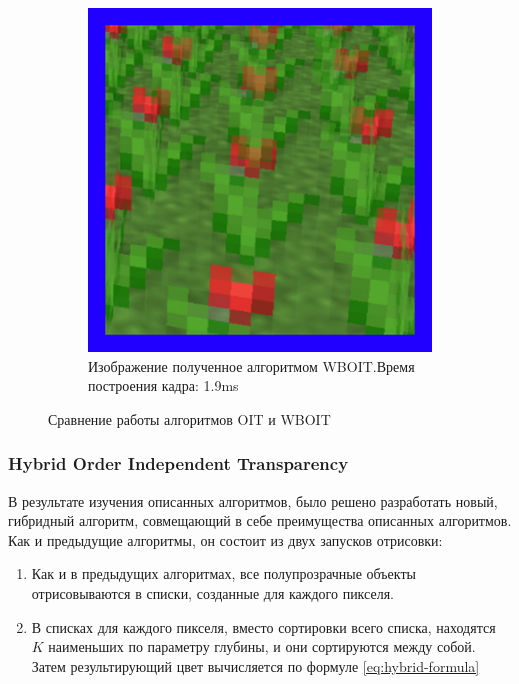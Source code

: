 \begin{figure}[!htbp]
\begin{subfigure}[b]{0.3\textwidth}
					\includegraphics[width=\textwidth]{my_folder/images//wboit_flower}
					\caption{Изображение полученное алгоритмом WBOIT.\linebreak Время построения кадра: 1.9ms}
					\label{fig:wboit_flower}
				\end{subfigure}				
				\captionsetup{justification=centering} %
				\caption{Сравнение работы алгоритмов OIT и WBOIT}\label{fig:oit_vs_wboit} 
			\end{figure}
			
		\subsubsection{Hybrid Order Independent Transparency} \label{ch3:render_pass:transparents:hybrid_oit}
			В результате изучения описанных алгоритмов, было решено разработать новый, гибридный алгоритм, совмещающий в себе преимущества описанных алгоритмов. Как и предыдущие алгоритмы, он состоит из двух запусков отрисовки:
			
			\begin{enumerate}[1.]
				\item Как и в предыдущих алгоритмах, все полупрозрачные объекты отрисовываются в списки, созданные для каждого пикселя.
				\item В списках для каждого пикселя, вместо сортировки всего списка, находятся $K$ наименьших по параметру глубины, и они сортируются между собой. Затем результирующий цвет вычисляется по формуле \ref{eq:hybrid-formula}
			\end{enumerate}
			
